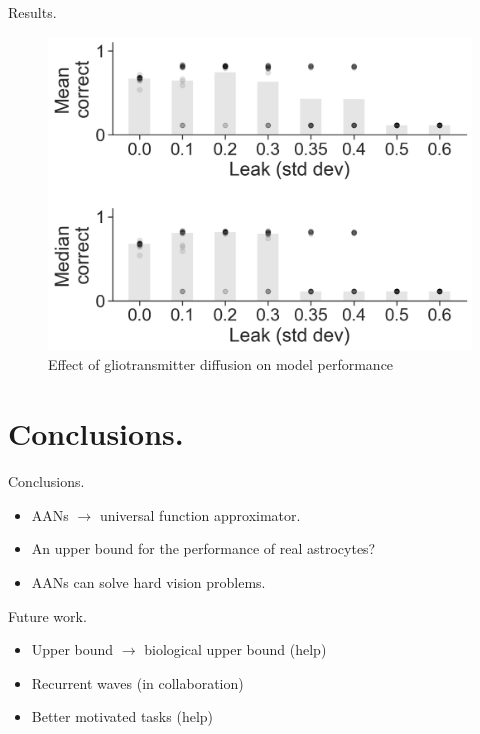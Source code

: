 \documentclass[10pt]{beamer}
\begin{document}
\begin{frame}[fragile]{Results.}
\begin{figure}
    \centering
    \includegraphics[scale=0.2]{images/leak.png} 
    \caption{Effect of gliotransmitter diffusion on model performance}
\end{figure}
\end{frame}
\section[Conclusions.]{Conclusions.}
\begin{frame}[fragile]{Conclusions.}
\begin{itemize}
\item AANs $\rightarrow$ universal function approximator.
\item An \alert{upper bound} for the performance of real astrocytes? 
\item AANs can solve hard vision problems.
\end{itemize}
\end{frame}

\begin{frame}[fragile]{Future work.}
\begin{itemize}
\item Upper bound $\rightarrow$ biological upper bound (\alert{help})
\item Recurrent waves (in collaboration)
\item Better motivated tasks (\alert{help})
\end{itemize}
\end{frame}
\end{document}
